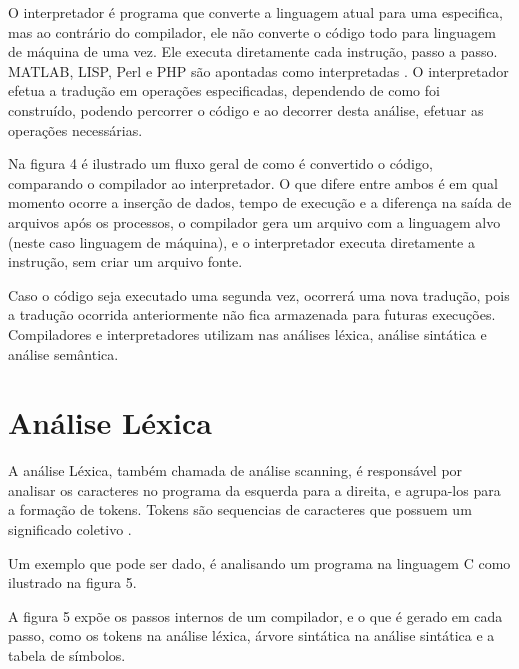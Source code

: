\documentclass[12pt,oneside,a4paper,chapter=TITLE,section=TITLE,sumario=tradicional]{abntex2}
\begin{document}
O interpretador é programa que converte a linguagem atual para uma especifica, mas ao contrário do compilador, ele não converte o código todo para linguagem de máquina de uma vez. Ele executa diretamente cada instrução, passo a passo. MATLAB, LISP, Perl e PHP são apontadas como interpretadas \cite{penelope2019}.  O interpretador efetua a tradução em operações especificadas, dependendo de como foi construído, podendo percorrer o código e ao decorrer desta análise, efetuar as operações necessárias. 

Na figura 4 é ilustrado um fluxo geral de como é convertido o código, comparando o compilador ao interpretador. O que difere entre ambos é em qual momento ocorre a inserção de dados, tempo de execução e a diferença na saída de arquivos após os processos, o compilador gera um arquivo com a linguagem alvo (neste caso linguagem de máquina), e o interpretador executa diretamente a instrução, sem criar um arquivo fonte.

\begin{figure}[htb]
\end{figure}

Caso o código seja executado uma segunda vez, ocorrerá uma nova tradução, pois a tradução ocorrida anteriormente não fica armazenada para futuras execuções. Compiladores e interpretadores utilizam nas análises léxica, análise sintática e análise semântica.

\section{Análise Léxica}
\label{sec:analise-lexica}

A análise Léxica, também chamada de análise scanning, é responsável por analisar os caracteres no programa da esquerda para a direita, e agrupa-los para a formação de tokens. Tokens são sequencias de caracteres que possuem um significado coletivo \cite{alfred1995}.

Um exemplo que pode ser dado, é analisando um programa na linguagem C como ilustrado na figura 5.

\begin{figure}[htb]
\end{figure}

A figura 5 expõe os passos internos de um compilador, e o que é gerado em cada passo, como os tokens na análise léxica, árvore sintática na análise sintática e a tabela de símbolos.
\end{document}
